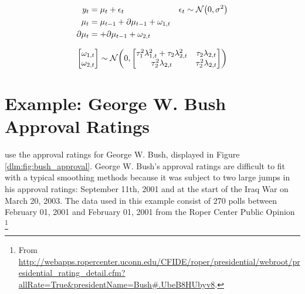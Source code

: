 \begin{equation}
  \label{dlm:eq:20}
  \begin{aligned}[t]
    y_{t} &= \mu_{t} + \epsilon_{t} & \epsilon_{t} & \sim \mathcal{N}\mathopen{}\left(0, \sigma^{2}\right)\mathclose{} \\
    \mu_{t} &= \mu_{t - 1} + \partial \mu_{t - 1} + \omega_{1, t} \\
    \partial \mu_{t} &= + \partial \mu_{t - 1} + \omega_{2, t} \\
  \end{aligned}
\end{equation}


\begin{equation}
\label{dlm:eq:26}
\begin{bmatrix}
  \omega_{1, t} \\
  \omega_{2, t}
\end{bmatrix}
\sim \mathcal{N}\mathopen{}\left(0,
  \begin{bmatrix}
    \tau_{1}^{2} \lambda_{1, t}^{2} + \tau_{2} \lambda_{2, t}^{2} & \tau_{2} \lambda_{2, t} \\
    \tau_{2}^{2} \lambda_{2, t} & \tau_{2}^{2} \lambda_{2, t}
  \end{bmatrix}
\right)\mathclose{}
\end{equation}


\section{Example: George W. Bush Approval Ratings}
\label{dlm:sec:george-w.-bush}

\textcite{RatkovicEng2010} use the approval ratings for George W. Bush, displayed in Figure \ref{dlm:fig:bush_approval}.
George W. Bush's approval ratings are difficult to fit with a typical smoothing methods because it was subject to two large jumps in his approval ratings: September 11th, 2001 and at the start of the Iraq War on March 20, 2003.
The data used in this example consist of 270 polls between February 01, 2001 and February 01, 2001 from the Roper Center Public Opinion \footnote{From \url{http://webapps.ropercenter.uconn.edu/CFIDE/roper/presidential/webroot/presidential_rating_detail.cfm?allRate=True\&presidentName=Bush\#.UbeB8HUbyv8}.}

